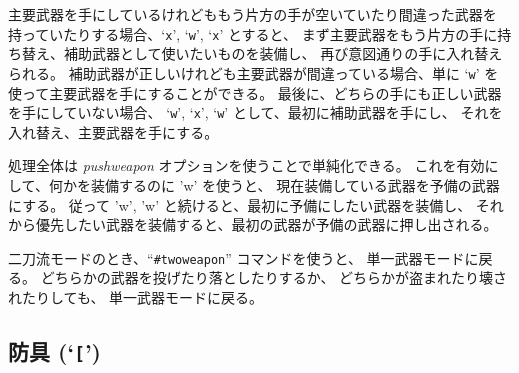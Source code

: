 主要武器を手にしているけれどももう片方の手が空いていたり間違った武器を
持っていたりする場合、`{\tt x}', `{\tt w}', `{\tt x}' とすると、
まず主要武器をもう片方の手に持ち替え、補助武器として使いたいものを装備し、
再び意図通りの手に入れ替えられる。
補助武器が正しいけれども主要武器が間違っている場合、単に
`{\tt w}' を使って主要武器を手にすることができる。
最後に、どちらの手にも正しい武器を手にしていない場合、
`{\tt w}', `{\tt x}', `{\tt w}' として、最初に補助武器を手にし、
それを入れ替え、主要武器を手にする。

処理全体は
{\it pushweapon\/}
オプションを使うことで単純化できる。
これを有効にして、何かを装備するのに 'w' を使うと、
現在装備している武器を予備の武器にする。
従って 'w', 'w' と続けると、最初に予備にしたい武器を装備し、
それから優先したい武器を装備すると、最初の武器が予備の武器に押し出される。

二刀流モードのとき、``{\tt \#twoweapon}'' コマンドを使うと、
単一武器モードに戻る。
どちらかの武器を投げたり落としたりするか、
どちらかが盗まれたり壊されたりしても、
単一武器モードに戻る。

\subsection*{防具 (`{\tt [}')}

